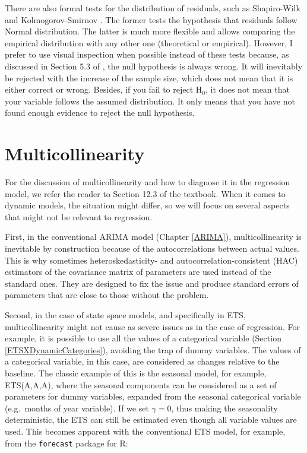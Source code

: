 \documentclass[]{book}
\theoremstyle{definition}
\theoremstyle{definition}
\theoremstyle{definition}
\theoremstyle{definition}
\theoremstyle{remark}
\begin{document}
There are also formal tests for the distribution of residuals, such as Shapiro-Wilk \citep{WikipediaShapiroWilk2021} and Kolmogorov-Smirnov \citep{WikipediaKolmogorovSmirnov2021}. The former tests the hypothesis that residuals follow Normal distribution. The latter is much more flexible and allows comparing the empirical distribution with any other one (theoretical or empirical). However, I prefer to use visual inspection when possible instead of these tests because, as discussed in Section 5.3 of \citet{SvetunkovSBA}, the null hypothesis is always wrong. It will inevitably be rejected with the increase of the sample size, which does not mean that it is either correct or wrong. Besides, if you fail to reject H\(_0\), it does not mean that your variable follows the assumed distribution. It only means that you have not found enough evidence to reject the null hypothesis.

\hypertarget{diagnosticsMulticollinearity}{%
\section{Multicollinearity}\label{diagnosticsMulticollinearity}}

For the discussion of multicollinearity and how to diagnose it in the regression model, we refer the reader to Section 12.3 of the \citet{SvetunkovSBA} textbook. When it comes to dynamic models, the situation might differ, so we will focus on several aspects that might not be relevant to regression.

First, in the conventional ARIMA model (Chapter \ref{ARIMA}), multicollinearity is inevitable by construction because of the autocorrelations between actual values. This is why sometimes heteroskedasticity- and autocorrelation-consistent (HAC) estimators of the covariance matrix \citep[see Section 15.4 of][]{Hanck2020} of parameters are used instead of the standard ones. They are designed to fix the issue and produce standard errors of parameters that are close to those without the problem.

Second, in the case of state space models, and specifically in ETS, multicollinearity might not cause as severe issues as in the case of regression. For example, it is possible to use all the values of a categorical variable (Section \ref{ETSXDynamicCategories}), avoiding the trap of dummy variables. The values of a categorical variable, in this case, are considered as changes relative to the baseline. The classic example of this is the seasonal model, for example, ETS(A,A,A), where the seasonal components can be considered as a set of parameters for dummy variables, expanded from the seasonal categorical variable (e.g.~months of year variable). If we set \(\gamma=0\), thus making the seasonality deterministic, the ETS can still be estimated even though all variable values are used. This becomes apparent with the conventional ETS model, for example, from the \texttt{forecast} package for R:
\end{document}
